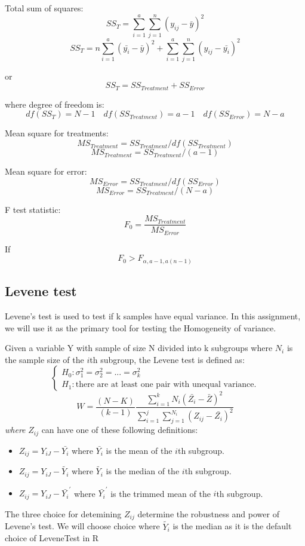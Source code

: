 Total sum of squares:
\[ SS_T = \sum_{i = 1}^{a} \sum_{j = 1}^{n} (y_{ij} - \bar{y})^2\]
\[ SS_T = n\sum_{i=1}^{a}(\bar{y_i}-\bar{y})^2 + \sum_{i=1}^{a}\sum_{j=1}^{n}(y_{ij}-\bar{y_i})^2\]

or
\[ SS_T = SS_{Treatment}+SS_{Error}\]

where degree of freedom is:
\[df(SS_T) = N - 1 \quad df(SS_{Treatment}) = a - 1 \quad df(SS_{Error}) = N - a \]

Mean square for treatments: 
\[MS_{Treatment} = SS_{Treatment} / df(SS_{Treatment})\]
\[MS_{Treatment} = SS_{Treatment} / (a - 1)\]

Mean square for error: 
\[MS_{Error} = SS_{Treatment} / df(SS_{Error})\]
\[MS_{Error} = SS_{Treatment} / (N - a)\]   

F test statistic: 
\[F_0 = \frac{MS_{Treatment}}{MS_{Error}}\]

If \[F_0 > F_{\alpha , a-1,a(n-1)}\]


\subsection{Levene test}
Levene's test is used to test if k samples have equal variance. In this assignment, we will use it as the primary tool for testing the Homogeneity of variance.

Given a variable Y with sample of size N divided into k subgroups where $N_i$ is the sample size of the $i$th subgroup, the Levene test is defined as:
\[
\begin{cases}
    H_0: \sigma_1^2 = \sigma_2^2 =...=\sigma_k^2 \\ 
    H_1: \text{there are at least one pair with unequal variance.}
\end{cases}
\]
\[W = \frac{(N-K)}{(k-1)}\frac{\sum_{i=1}^{k}N_i(\bar{Z_i}-\bar{Z})^2}{\sum_{i=1}^{j}\sum_{j=1}^{N_i}(Z_{ij}-\bar{Z_i})^2}\]
\textit{where} $Z_{ij}$ can have one of these following definitions:

\begin{itemize}
    \item $Z_{ij} = Y_{iJ} - \bar{Y_i}$ where $\bar{Y_i}$ is the mean  of the $i$th subgroup.
    \item $Z_{ij} = Y_{iJ} - \tilde{Y_i}$ where $\tilde{Y_i}$ is the median of the $i$th subgroup.
    \item $Z_{ij} = Y_{iJ} - \bar{Y_i}^{'}$ where $\bar{Y_i}^{'}$ is the trimmed mean of the $i$th subgroup.
\end{itemize}

The three choice for detemining $Z_{ij}$ determine the robustness and power of Levene's test. We will choose choice where $\tilde{Y_i}$ is the median as it is the default choice of LeveneTest in R

